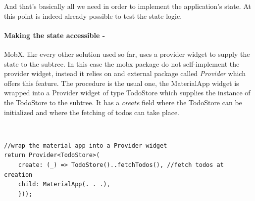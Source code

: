 And that’s basically all we need in order to implement the application’s state. At this point is indeed already possible to test the state logic.

\paragraph{Making the state accessible - }
\label{subpar:todo_app_bloc_core_state} MobX, like every other solution used so far, uses a provider widget to supply the state to the subtree. In this case the mobx package do not self-implement the provider widget, instead it relies on and external package called \textit{Provider} which offers this feature. The procedure is the usual one, the MaterialApp widget is wrapped into a Provider widget of type TodoStore which supplies the instance of the TodoStore to the subtree. It has a \textit{create} field where the TodoStore can be initialized and where the fetching of todos can take place.
\begin{code}
\mbox{}\\
 \mbox{}
		\label{code:2.14}
\begin{verbatim}
//wrap the material app into a Provider widget
return Provider<TodoStore>(
    create: (_) => TodoStore()..fetchTodos(), //fetch todos at creation
    child: MaterialApp(. . .),
    }));
\end{verbatim}
\mbox{}
\end{code}



